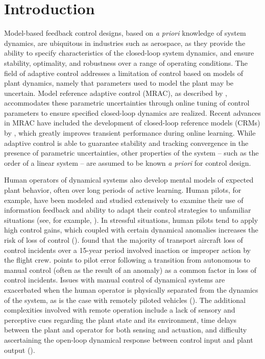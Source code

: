 \documentclass[english]{ifacconf}
\begin{document}
\section{Introduction}
Model-based feedback control designs, based on \textit{a priori} knowledge of system dynamics, are ubiquitous in industries such as aerospace, as they provide the ability to specify characteristics of the closed-loop system dynamics, and ensure stability, optimality, and robustness over a range of operating conditions. The field of adaptive control addresses a limitation of control based on models of plant dynamics, namely that parameters used to model the plant may be uncertain. Model reference adaptive control (MRAC), as described by \cite{narendra2012stable}, accommodates these parametric uncertainties through online tuning of control parameters to ensure specified closed-loop dynamics are realized. Recent advances in MRAC have included the development of closed-loop reference models (CRMs) by \cite{gibson2013adaptive}, which greatly improves transient performance during online learning. While adaptive control is able to guarantee stability and tracking convergence in the presence of parametric uncertainties, other properties of the system -- such as the order of a linear system -- are assumed to be known \textit{a priori} for control design. 

Human operators of dynamical systems also develop mental models of expected plant behavior, often over long periods of active learning. Human pilots, for example, have been modeled and studied extensively to examine their use of information feedback and ability to adapt their control strategies to unfamiliar situations (see, for example, \cite{mcruer1967review, phatak1969model, hess2015modeling, zaal2016manual}). In stressful situations, human pilots tend to apply high control gains, which coupled with certain dynamical anomalies increases the risk of loss of control (\cite{hess1997unified}). \cite{belcastro2014preliminary} found that the majority of transport aircraft loss of control incidents over a 15-year period involved inaction or improper action by the flight crew. \cite{endsley1996automation} points to pilot error following a transition from autonomous to manual control (often as the result of an anomaly) as a common factor in loss of control incidents. Issues with manual control of dynamical systems are exacerbated when the human operator is physically separated from the dynamics of the system, as is the case with remotely piloted vehicles (\cite{mccarley2004human, tvaryanas2008recurrent}). The additional complexities involved with remote operation include a lack of sensory and perceptive cues regarding the plant state and its environment, time delays between the plant and operator for both sensing and actuation, and difficulty ascertaining the open-loop dynamical response between control input and plant output (\cite{lam2008haptic}). 
\end{document}
